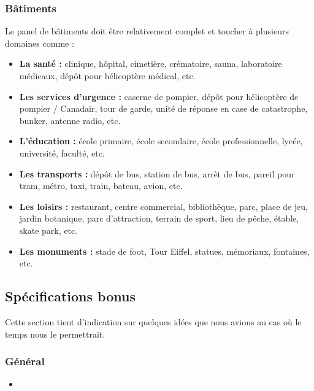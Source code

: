 \documentclass[a4paper,10pt,openany,oneside]{report}
\begin{document}
\subsubsection{Bâtiments}
Le panel de bâtiments doit être relativement complet et toucher à plusieurs domaines comme :
\begin{itemize}
\item \textbf{La santé : }clinique, hôpital, cimetière, crématoire, sauna, laboratoire médicaux, dépôt pour hélicoptère médical, etc.
\item \textbf{Les services d'urgence : }caserne de pompier, dépôt pour hélicoptère de pompier / Canadair, tour de garde, unité de réponse en case de catastrophe, bunker, antenne radio, etc.
\item \textbf{L'éducation : }école primaire, école secondaire, école professionnelle, lycée, université, faculté, etc.
\item \textbf{Les transports : }dépôt de bus, station de bus, arrêt de bus, pareil pour tram, métro, taxi, train, bateau, avion, etc.
\item \textbf{Les loisirs : }restaurant, centre commercial, bibliothèque, parc, place de jeu, jardin botanique, parc d'attraction, terrain de sport, lieu de pêche, étable, skate park, etc.
\item \textbf{Les monuments : }stade de foot, Tour Eiffel, statues, mémoriaux, fontaines, etc.
\end{itemize}


\subsection{Spécifications \textcolor{bonus}{bonus}}
Cette section tient d'indication sur quelques idées que nous avions au cas où le temps nous le permettrait.

\subsubsection{Général}
\begin{itemize}
\item
\end{itemize}
\end{document}
